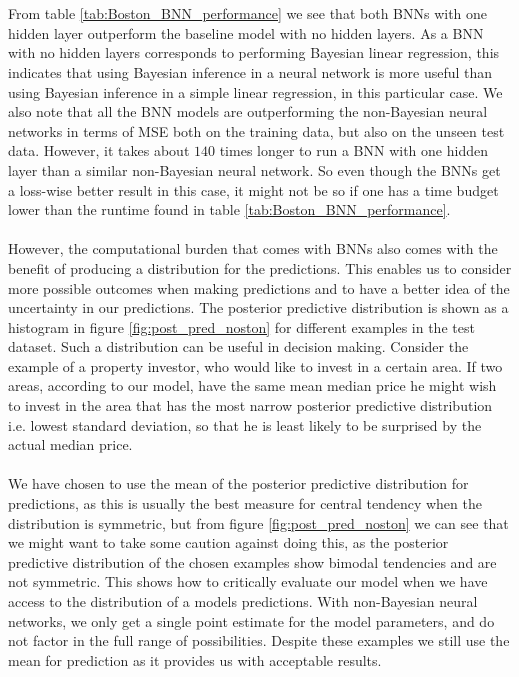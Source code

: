 \\
\\
From table \ref{tab:Boston_BNN_performance} we see that both BNNs with one hidden layer outperform the baseline model with no hidden layers. As a BNN with no hidden layers corresponds to performing Bayesian linear regression, this indicates that using Bayesian inference in a neural network is more useful than using Bayesian inference in a simple linear regression, in this particular case. We also note that all the BNN models are outperforming the non-Bayesian neural networks in terms of MSE both on the training data, but also on the unseen test data. However, it takes about $140$ times longer to run a BNN with one hidden layer than a similar non-Bayesian neural network. So even though the BNNs get a loss-wise better result in this case, it might not be so if one has a time budget lower than the runtime found in table \ref{tab:Boston_BNN_performance}.
\\
\\
However, the computational burden that comes with BNNs also comes with the benefit of producing a distribution for the predictions. This enables us to consider more possible outcomes when making predictions and to have a better idea of the uncertainty in our predictions. The posterior predictive distribution is shown as a histogram in figure \ref{fig:post_pred_noston} for different examples in the test dataset. Such a distribution can be useful in decision making. Consider the example of a property investor, who would like to invest in a certain area. If two areas, according to our model, have the same mean median price he might wish to invest in the area that has the most narrow posterior predictive distribution i.e. lowest standard deviation, so that he is least likely to be surprised by the actual median price. 
\\
\\
We have chosen to use the mean of the posterior predictive distribution for predictions, as this is usually the best measure for central tendency when the distribution is symmetric, but from figure \ref{fig:post_pred_noston} we can see that we might want to take some caution against doing this, as the posterior predictive distribution of the chosen examples show bimodal tendencies and are not symmetric. This shows how to critically evaluate our model when we have access to the distribution of a models predictions. With non-Bayesian neural networks, we only get a single point estimate for the model parameters, and do not factor in the full range of possibilities. Despite these examples we still use the mean for prediction as it provides us with acceptable results. 

